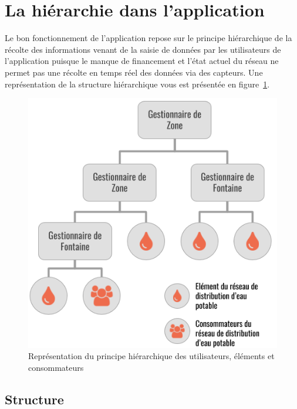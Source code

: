 \documentclass{EPL-master-thesis-covers-FR}
\begin{document}
		\section{La hiérarchie dans l'application}

			Le bon fonctionnement de l'application repose sur le principe hiérarchique de la récolte des informations venant de la saisie de données par les utilisateurs de l'application puisque le manque de financement et l'état actuel du réseau ne permet pas une récolte en temps réel des données via des capteurs. Une représentation de la structure hiérarchique vous est présentée en figure~\ref{fig:principe_hierarchique}.

			\begin{figure}[H]
				\centering
				\includegraphics[scale=0.45]{images/principe_hierarchique}
				\caption{Représentation du principe hiérarchique des utilisateurs, éléments et consommateurs}
				\label{fig:principe_hierarchique}
			\end{figure}

			\subsection*{Structure}
\end{document}
